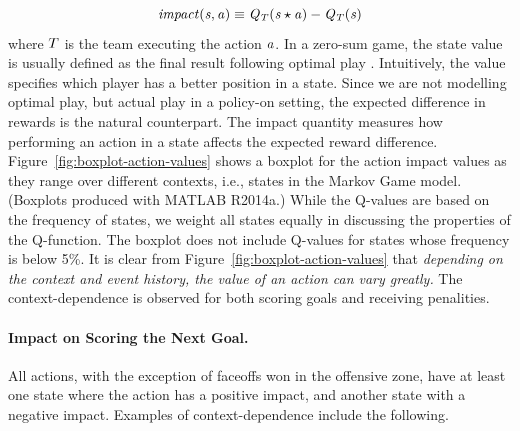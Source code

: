 \documentclass[]{article}
\begin{document}
\begin{equation*}
\it{impact}(s,a) \equiv Q_{T}(s \star a) - Q_{T}(s)
\end{equation*}
where $T$ is the team executing the action $a$. In a zero-sum game, the state value is usually defined as the final result following optimal play \citep{Russell2010}. Intuitively, the value specifies which player has a better position in a state. Since we are not modelling optimal play, but actual play in a policy-on setting, the expected difference in rewards is the natural counterpart. The impact quantity measures how performing an action in a state affects the expected reward difference.
Figure~\ref{fig:boxplot-action-values} shows a boxplot for the action impact values as they range over different contexts, i.e., states in the Markov Game model.
(Boxplots produced with MATLAB R2014a.)
While the Q-values are based on the frequency of states, we weight all states equally in discussing the properties of the Q-function. The boxplot does not include Q-values for states whose frequency is below 5\%.
It is clear from Figure~\ref{fig:boxplot-action-values} that {\em depending on the context and event history, the value of an action can vary greatly.} The context-dependence is observed for both scoring goals and receiving penalities.

\paragraph{Impact on Scoring the Next Goal.} All actions, with the exception of faceoffs won in the offensive zone, have at least one state where the action has a positive impact, and another state with a negative impact. Examples of context-dependence include the following.
\end{document}
